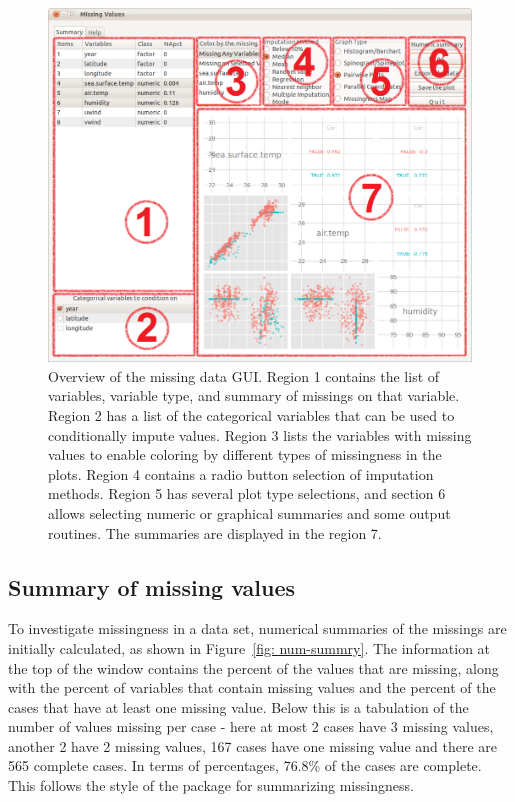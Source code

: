 \documentclass[article]{jss}
\begin{document}
\begin{center}
\begin{figure}[h]
\begin{centering}
\includegraphics[width=.9\textwidth]{fig1-1-0}
\par\end{centering}
\caption{Overview of the missing data GUI. Region 1 contains the list of variables, variable type, and summary of missings on that variable. Region 2 has a list of the categorical variables that can be used to conditionally impute values. Region 3 lists the variables with missing values to enable coloring by different types of missingness in the plots. Region 4 contains a radio button selection of imputation methods. Region 5 has several plot type selections, and section 6 allows selecting numeric or graphical summaries and some output routines. The summaries are displayed in the region 7.}
\end{figure}
\label{fig: missingGUI}
\par\end{center}

\subsection{Summary of missing values}

To investigate missingness in a data set, numerical summaries of the missings are initially calculated, as shown in Figure~\ref{fig: num-summry}. The information at the top of the window contains the percent of the values that are missing, along with the percent of variables that contain missing values and the percent of the cases that have at least one missing value. Below this is a tabulation of the number of values missing per case - here at most 2 cases have 3 missing values, another 2 have 2 missing values, 167 cases have one missing value and there are 565 complete cases. In terms of percentages, 76.8\% of the cases are complete. This follows the style of the  package for summarizing missingness.
\end{document}
